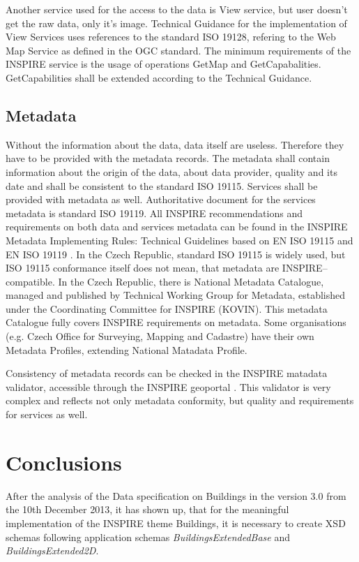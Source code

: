 \documentclass[eprint]{actapoly}
\begin{document}
Another service used for the access to the data is View service, but user doesn't get the raw data, only it's image. Technical Guidance for the implementation of View Services uses references to the standard ISO 19128, refering to the Web Map Service as defined in the OGC standard\cite{OGC:WMS}. The minimum requirements of the INSPIRE service is the usage of operations GetMap and GetCapabalities. GetCapabilities shall be extended according to the Technical Guidance.

\subsection{Metadata}

Without the information about the data, data itself are useless. Therefore they have to be provided with the metadata records. The metadata shall contain information about the origin of the data, about data provider, quality and its date and shall be consistent to the standard ISO 19115. Services shall be provided with metadata as well. Authoritative document for the services metadata is standard ISO 19119. All INSPIRE recommendations and requirements on both data and services metadata can be found in the INSPIRE Metadata Implementing Rules: Technical Guidelines based on EN ISO 19115 and EN ISO 19119 \cite{INSPIRE:MD}. In the Czech Republic, standard ISO 19115 is widely used, but ISO 19115 conformance itself does not mean, that metadata are INSPIRE--compatible\cite{Ruzicka:geoinformatics3}. In the Czech Republic, there is National Metadata Catalogue, managed and published by Technical Working Group for Metadata, established under the Coordinating Committee for INSPIRE (KOVIN). This metadata Catalogue fully covers INSPIRE requirements on metadata. Some organisations (e.g. Czech Office for Surveying, Mapping and Cadastre) have their own Metadata Profiles, extending National Matadata Profile.

Consistency of metadata records can be checked in the INSPIRE matadata validator, accessible through the INSPIRE geoportal \cite{INSPIRE:GP}. This validator is very complex and reflects not only metadata conformity, but quality and requirements for services as well. 

\section{Conclusions}

After the analysis of the Data specification on Buildings in the version 3.0 from the 10th December 2013, it has shown up, that for the meaningful implementation of the INSPIRE theme Buildings, it is necessary to create XSD schemas following application schemas \textit{BuildingsExtendedBase} and \textit{BuildingsExtended2D}.
\end{document}
